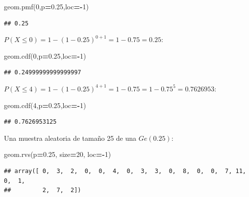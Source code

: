 \documentclass[]{book}
\newenvironment{Shaded}{\begin{snugshade}}{\end{snugshade}}
\newcommand{\DecValTok}[1]{\textcolor[rgb]{0.00,0.00,0.81}{#1}}
\newcommand{\FloatTok}[1]{\textcolor[rgb]{0.00,0.00,0.81}{#1}}
\newcommand{\NormalTok}[1]{#1}
\newcommand{\OperatorTok}[1]{\textcolor[rgb]{0.81,0.36,0.00}{\textbf{#1}}}
\begin{document}
\begin{Shaded}
\begin{Highlighting}[]
\NormalTok{geom.pmf(}\DecValTok{0}\NormalTok{,p}\OperatorTok{=}\FloatTok{0.25}\NormalTok{,loc}\OperatorTok{=-}\DecValTok{1}\NormalTok{)}
\end{Highlighting}
\end{Shaded}

\begin{verbatim}
## 0.25
\end{verbatim}

\(P(X\leq 0)=1- (1-0.25)^{0+1}=1-0.75=0.25\):

\begin{Shaded}
\begin{Highlighting}[]
\NormalTok{geom.cdf(}\DecValTok{0}\NormalTok{,p}\OperatorTok{=}\FloatTok{0.25}\NormalTok{,loc}\OperatorTok{=-}\DecValTok{1}\NormalTok{)}
\end{Highlighting}
\end{Shaded}

\begin{verbatim}
## 0.24999999999999997
\end{verbatim}

\(P(X\leq 4)=1-(1-0.25)^{4+1}=1-0.75=1-0.75^5=0.7626953\):

\begin{Shaded}
\begin{Highlighting}[]
\NormalTok{geom.cdf(}\DecValTok{4}\NormalTok{,p}\OperatorTok{=}\FloatTok{0.25}\NormalTok{,loc}\OperatorTok{=-}\DecValTok{1}\NormalTok{)}
\end{Highlighting}
\end{Shaded}

\begin{verbatim}
## 0.7626953125
\end{verbatim}

Una muestra aleatoria de tamaño 25 de una \(Ge(0.25)\):

\begin{Shaded}
\begin{Highlighting}[]
\NormalTok{geom.rvs(p}\OperatorTok{=}\FloatTok{0.25}\NormalTok{, size}\OperatorTok{=}\DecValTok{20}\NormalTok{, loc}\OperatorTok{=-}\DecValTok{1}\NormalTok{)}
\end{Highlighting}
\end{Shaded}

\begin{verbatim}
## array([ 0,  3,  2,  0,  0,  4,  0,  3,  3,  0,  8,  0,  0,  7, 11,  0,  1,
##         2,  7,  2])
\end{verbatim}
\end{document}

